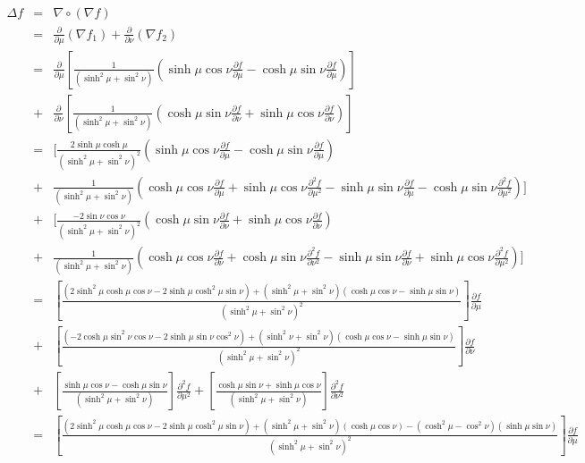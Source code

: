\documentclass[11pt,a4paper]{article}
\begin{document}
\Spart{
}
\[\begin{array}{rcl}
\Delta f&=&\nabla\circ(\nabla f)\\
&=&\frac{\partial}{\partial\mu}(\nabla f_1)+\frac{\partial}{\partial\nu}(\nabla f_2)\\
&=&\frac{\partial}{\partial\mu}\left[\frac{1}{(\sinh^2\mu+\sin^2\nu)}(\sinh\mu\cos\nu\frac{\partial f}{\partial\mu}-\cosh\mu\sin\nu\frac{\partial f}{\partial \mu})\right]\\
&+&\frac{\partial}{\partial\nu}\left[\frac{1}{(\sinh^2\mu+\sin^2\nu)}(\cosh\mu\sin\nu\frac{\partial f}{\partial \nu}+\sinh\mu\cos\nu\frac{\partial f}{\partial \nu})\right]\\
&=&\bigg[\frac{2\sinh\mu\cosh\mu}{(\sinh^2\mu+\sin^2\nu)^2}\left(\sinh\mu\cos\nu\frac{\partial f}{\partial\mu}-\cosh\mu\sin\nu\frac{\partial f}{\partial \mu}\right)\\
&+&\frac{1}{(\sinh^2\mu+\sin^2\nu)}\left(\cosh\mu\cos\nu\frac{\partial f}{\partial\mu}+\sinh\mu\cos\nu\frac{\partial^2f}{\partial\mu^2}-\sinh\mu\sin\nu\frac{\partial f}{\partial \mu}-\cosh\mu\sin\nu\frac{\partial^2f}{\partial\mu^2}\right)\bigg]\\
&+&\bigg[\frac{-2\sin\nu\cos\nu}{(\sinh^2\mu+\sin^2\nu)^2}(\cosh\mu\sin\nu\frac{\partial f}{\partial\nu}+\sinh\mu\cos\nu\frac{\partial f}{\partial\nu})\\
&+&\frac{1}{(\sinh^2\mu+\sin^2\nu)}(\cosh\mu\cos\nu\frac{\partial f}{\partial\nu}+\cosh\mu\sin\nu\frac{\partial^2f}{\partial\nu^2}-\sinh\mu\sin\nu\frac{\partial f}{\partial \nu}+\sinh\mu\cos\nu\frac{\partial^2f}{\partial\mu^2})\bigg]\\
&=&\left[\frac{(2\sinh^2\mu\cosh\mu\cos\nu-2\sinh\mu\cosh^2\mu\sin\nu)+(\sinh^2\mu+\sin^2\nu)(\cosh\mu\cos\nu-\sinh\mu\sin\nu)}{(\sinh^2\mu+\sin^2\nu)^2}\right]\frac{\partial f}{\partial\mu}\\
&+&\left[\frac{(-2\cosh\mu\sin^2\nu\cos\nu-2\sinh\mu\sin\nu\cos^2\nu)+(\sinh^2\nu+\sin^2\nu)(\cosh\mu\cos\nu-\sinh\mu\sin\nu)}{(\sinh^2\mu+\sin^2\nu)^2}\right]\frac{\partial f}{\partial\nu}\\
&+&\left[\frac{\sinh\mu\cos\nu-\cosh\mu\sin\nu}{(\sinh^2\mu+\sin^2\nu)}\right]\frac{\partial^2f}{\partial\mu^2}+\left[\frac{\cosh\mu\sin\nu+\sinh\mu\cos\nu}{(\sinh^2\mu+\sin^2\nu)}\right]\frac{\partial^2f}{\partial\nu^2}\\
&=&\left[\frac{(2\sinh^2\mu\cosh\mu\cos\nu-2\sinh\mu\cosh^2\mu\sin\nu)+(\sinh^2\mu+\sin^2\nu)(\cosh\mu\cos\nu)-(\cosh^2\mu-\cos^2\nu)(\sinh\mu\sin\nu)}{(\sinh^2\mu+\sin^2\nu)^2}\right]\frac{\partial f}{\partial\mu}\\

\end{array}\]
\end{document}
